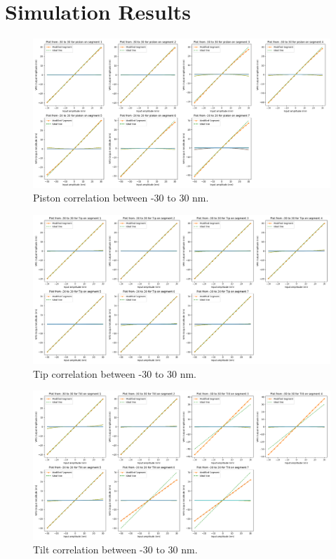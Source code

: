 
\chapter{Simulation Results} %

\label{AppendixB} %

\begin{figure}[H]
    \centering
    \includegraphics[width = 14cm]{Figures/Pist_response30.png}
    \caption{Piston correlation between -30 to 30 nm.}
    \label{fig:Pist30}
\end{figure}

\begin{figure}[H]
    \centering
    \includegraphics[width = 14cm]{Figures/Tip_response30.png}
    \caption{Tip correlation between -30 to 30 nm.}
    \label{fig:tip30}
\end{figure}

\begin{figure}[H]
    \centering
    \includegraphics[width = 14cm]{Figures/Tilt_response30.png}
    \caption{Tilt correlation between -30 to 30 nm.}
    \label{fig:Tilt30_app}
\end{figure}
